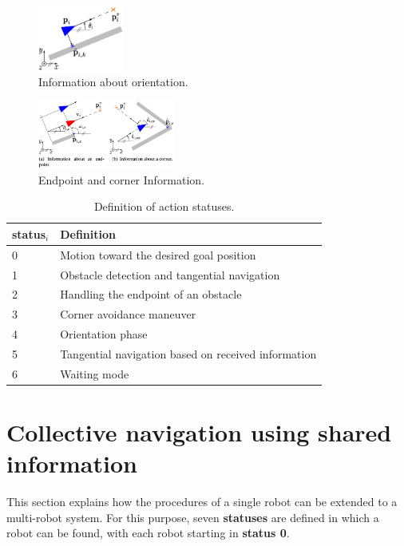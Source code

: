 \documentclass[conference]{IEEEtran}
\begin{document}
\begin{figure}[h]
    \centering
    \includegraphics[width=0.25\textwidth]{Pictures/Information about orientation.png}
    \caption{Information about orientation.}
    \label{fig:Information about orientation}
\end{figure}

\begin{figure}[h]
    \centering
    \includegraphics[width=0.4\textwidth]{Pictures/Endpoint and corner Information.png}
    \caption{Endpoint and corner Information.}
    \label{fig:Endpoint and corner Information}
\end{figure}

\begin{table}[h]
\centering
\begin{tabular}{ll}
\hline
\textbf{status$_i$} & \textbf{Definition} \\
\hline
0 & Motion toward the desired goal position \\
1 & Obstacle detection and tangential navigation \\
2 & Handling the endpoint of an obstacle \\
3 & Corner avoidance maneuver \\
4 & Orientation phase \\
5 & Tangential navigation based on received information \\
6 & Waiting mode \\
\hline
\end{tabular}
\caption{Definition of action statuses.}
\label{tab:status}
\end{table}


\section{Collective navigation using shared information}
This section explains how the procedures of a single robot can be extended to a 
multi-robot system. For this purpose, seven \textbf{statuses} are defined in which 
a robot can be found, with each robot starting in \textbf{status 0}.
\end{document}
